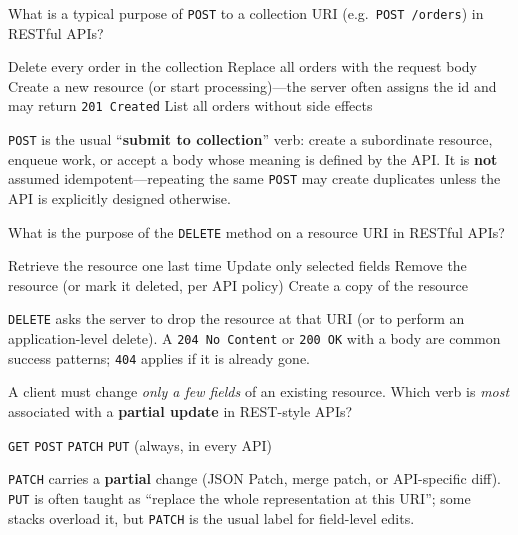 \question[4]
What is a typical purpose of \texttt{POST} to a collection URI (e.g.\ \texttt{POST /orders}) in RESTful APIs?
\begin{choices}
  \choice Delete every order in the collection
  \choice Replace all orders with the request body
  \CorrectChoice Create a new resource (or start processing)---the server often assigns the id and may return \texttt{201 Created}
  \choice List all orders without side effects
\end{choices}
\begin{solution}
  \texttt{POST} is the usual ``\textbf{submit to collection}'' verb: create a subordinate resource, enqueue work, or accept a body whose meaning is defined by the API. It is \textbf{not} assumed idempotent---repeating the same \texttt{POST} may create duplicates unless the API is explicitly designed otherwise.
\end{solution}

\question[4]
What is the purpose of the \texttt{DELETE} method on a resource URI in RESTful APIs?
\begin{choices}
  \choice Retrieve the resource one last time
  \choice Update only selected fields
  \CorrectChoice Remove the resource (or mark it deleted, per API policy)
  \choice Create a copy of the resource
\end{choices}
\begin{solution}
  \texttt{DELETE} asks the server to drop the resource at that URI (or to perform an application-level delete). A \texttt{204 No Content} or \texttt{200 OK} with a body are common success patterns; \texttt{404} applies if it is already gone.
\end{solution}

\question[4]
A client must change \emph{only a few fields} of an existing resource. Which verb is \emph{most} associated with a \textbf{partial update} in REST-style APIs?
\begin{choices}
  \choice \texttt{GET}
  \choice \texttt{POST}
  \CorrectChoice \texttt{PATCH}
  \choice \texttt{PUT} (always, in every API)
\end{choices}
\begin{solution}
  \texttt{PATCH} carries a \textbf{partial} change (JSON Patch, merge patch, or API-specific diff). \texttt{PUT} is often taught as ``replace the whole representation at this URI''; some stacks overload it, but \texttt{PATCH} is the usual label for field-level edits.
\end{solution}


